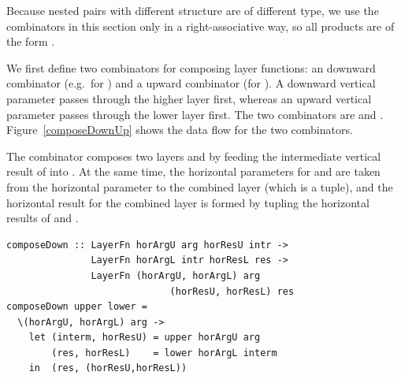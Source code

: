 \documentclass[preprint,natbib]{sigplanconf}
\begin{document}
\bc Because nested pairs with different structure are of different type, we use the combinators in this section only in a right-associative way, so all products are of the form . 
\ec

We first define two combinators for composing layer functions: an downward combinator (e.g.\ for ) and a upward combinator (for ). A downward vertical parameter passes through the higher layer first, whereas an upward vertical parameter passes through the lower layer first. The two combinators are  and . Figure~\ref{composeDownUp} shows the data flow for the two combinators. 

The combinator  composes two layers  and  by feeding the intermediate vertical result of  into . At the same time, the horizontal parameters for  and  are taken from the horizontal parameter to the combined layer (which is a tuple), and the horizontal result for the combined layer is formed by tupling the horizontal results of  and . 

\begin{small}
\begin{verbatim}
composeDown :: LayerFn horArgU arg horResU intr ->
               LayerFn horArgL intr horResL res ->
               LayerFn (horArgU, horArgL) arg 
                             (horResU, horResL) res
composeDown upper lower = 
  \(horArgU, horArgL) arg ->                                           
    let (interm, horResU) = upper horArgU arg
        (res, horResL)    = lower horArgL interm            
    in  (res, (horResU,horResL))
\end{verbatim}
\end{small}
\end{document}

